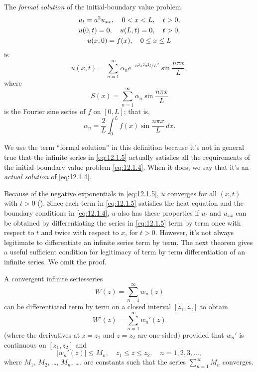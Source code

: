 \begin{definition}\label{thmtype:12.1.1}
The
\emph{\color{blue}formal solution}
of the initial-boundary value
problem
\begin{gather}
u_t=a^2u_{xx},\quad 0<x<L,\quad t>0,\notag\\
u(0,t)=0,\quad u(L,t)=0,\quad t>0,\label{eq:12.1.4}\\
u(x,0)=f(x),\quad 0\le x\le L\notag
\end{gather}
is
\begin{equation} \label{eq:12.1.5}
u(x,t)=\sum_{n=1}^\infty \alpha_ne^{-n^2\pi^2a^2t/L^2}\sin\frac{n\pi x}{L},
\end{equation}
where
\[
S(x)=\sum_{n=1}^\infty \alpha_n\sin\frac{n\pi x}{L}
\]
is the Fourier sine series of $f$ on $[0,L]$;
that is,
\[
\alpha_n=\frac{2}{L}\int_0^Lf(x)\sin\frac{n\pi x}{L}\,dx.
\]
\end{definition}

We use the term ``formal solution'' in this definition
because it's not in general true that the infinite series in
\eqref{eq:12.1.5} actually satisfies all the requirements of the
initial-boundary value problem \eqref{eq:12.1.4}.  When it does,
we say that it's an
\emph{\color{blue}actual solution}
of \eqref{eq:12.1.4}.


Because of the negative
exponentials in
\eqref{eq:12.1.5},
$u$ converges for all $(x,t)$ with   $t>0$ ().
Since each term in \eqref{eq:12.1.5} satisfies the heat equation and the
boundary conditions in \eqref{eq:12.1.4},
$u$ also has these properties  if $u_t$ and $u_{xx}$ can be obtained
by differentiating the series in \eqref{eq:12.1.5} term by term once with
respect to $t$ and twice with respect to $x$, for $t>0$.
However,  it's not always legitimate to differentiate an infinite
series term by term. The next theorem
gives a useful sufficient condition for legitimacy of  term by term
differentiation of an infinite series. We omit the proof.


\begin{theorem}\label{thmtype:12.1.2}
A convergent infinite
seriesseries
\[
W(z)=\sum_{n=1}^\infty  w_n(z)
\]
can be differentiated term by term on a closed interval $[z_1,z_2]$
to obtain
\[
W'(z)=\sum_{n=1}^\infty w_n'(z)
\]
(where the derivatives at $z=z_1$ and $z=z_2$ are one-sided)
provided that $w_n'$ is continuous on $[z_1,z_2]$ and
\[
|w_n'(z)|\le M_n,\quad z_1\le z\le z_2,\quad n=1,2,3,\dots,
\]
where  $M_1$, $M_2$, \dots, $M_n$, \dots, are constants such that the
series
$\sum_{n=1}^\infty M_n$ converges.
\end{theorem}

